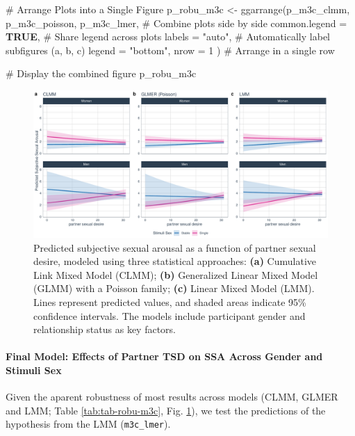 \documentclass[
  bookmarksnumbered]{article}
\newenvironment{Shaded}{\begin{snugshade}}{\end{snugshade}}
\newcommand{\AttributeTok}[1]{\textcolor[rgb]{0.80,0.80,0.80}{#1}}
\newcommand{\CommentTok}[1]{\textcolor[rgb]{0.50,0.62,0.50}{#1}}
\newcommand{\ConstantTok}[1]{\textcolor[rgb]{0.86,0.64,0.64}{\textbf{#1}}}
\newcommand{\DecValTok}[1]{\textcolor[rgb]{0.86,0.86,0.80}{#1}}
\newcommand{\FunctionTok}[1]{\textcolor[rgb]{0.94,0.94,0.56}{#1}}
\newcommand{\NormalTok}[1]{\textcolor[rgb]{0.80,0.80,0.80}{#1}}
\newcommand{\OtherTok}[1]{\textcolor[rgb]{0.94,0.94,0.56}{#1}}
\newcommand{\StringTok}[1]{\textcolor[rgb]{0.80,0.58,0.58}{#1}}
\begin{document}
\begin{Shaded}
\begin{Highlighting}[]
\CommentTok{\# Arrange Plots into a Single Figure}
\NormalTok{p\_robu\_m3c }\OtherTok{\textless{}{-}} \FunctionTok{ggarrange}\NormalTok{(p\_m3c\_clmm, p\_m3c\_poisson, p\_m3c\_lmer, }\CommentTok{\# Combine plots side by side}
  \AttributeTok{common.legend =} \ConstantTok{TRUE}\NormalTok{, }\CommentTok{\# Share legend across plots}
  \AttributeTok{labels =} \StringTok{"auto"}\NormalTok{, }\CommentTok{\# Automatically label subfigures (a, b, c)}
  \AttributeTok{legend =} \StringTok{"bottom"}\NormalTok{,}
  \AttributeTok{nrow =} \DecValTok{1}
\NormalTok{) }\CommentTok{\# Arrange in a single row}

\CommentTok{\# Display the combined figure}
\NormalTok{p\_robu\_m3c}
\end{Highlighting}
\end{Shaded}

\begin{figure}
\centering
\includegraphics{Sexual_Desire_Arousal_V2_files/figure-latex/preds-m3c-1.pdf}
\caption{\label{fig:preds-m3c}Predicted subjective sexual arousal as a function of partner sexual desire, modeled using three statistical approaches: \textbf{(a)} Cumulative Link Mixed Model (CLMM); \textbf{(b)} Generalized Linear Mixed Model (GLMM) with a Poisson family; \textbf{(c)} Linear Mixed Model (LMM). Lines represent predicted values, and shaded areas indicate 95\% confidence intervals. The models include participant gender and relationship status as key factors.}
\end{figure}

\paragraph{Final Model: Effects of Partner TSD on SSA Across Gender and Stimuli Sex}\label{final-model-effects-of-partner-tsd-on-ssa-across-gender-and-stimuli-sex-1}

Given the aparent robustness of most results across models (CLMM, GLMER and LMM; Table \ref{tab:tab-robu-m3c}, Fig. \ref{fig:preds-m3c}), we test the predictions of the hypothesis from the LMM (\texttt{m3c\_lmer}).
\end{document}
